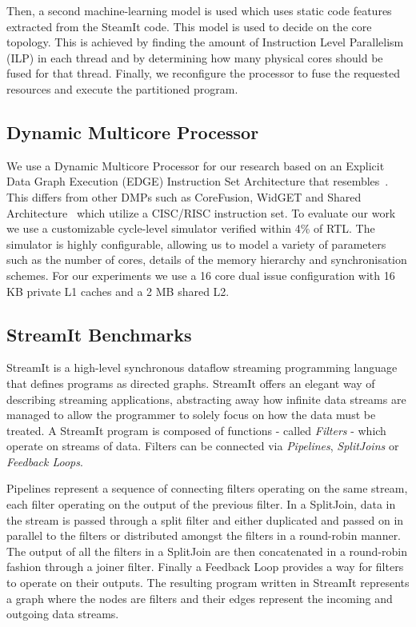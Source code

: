 Then, a second machine-learning model is used which uses static code features extracted from the SteamIt code.
This model is used to decide on the core topology.
This is achieved by finding the amount of Instruction Level Parallelism (ILP) in each thread and by determining how many physical cores should be fused for that thread.
Finally, we reconfigure the processor to fuse the requested resources and execute the partitioned program.


\subsection{Dynamic Multicore Processor}

We use a Dynamic Multicore Processor for our research based on an Explicit Data Graph Execution (EDGE) Instruction Set Architecture that resembles~\cite{sibi2014}.
This differs from other DMPs such as CoreFusion, WidGET and Shared Architecture~\cite{ipek2007corefusion,watanabe2010widget,zhou2014sharingarch} which utilize a CISC/RISC instruction set.
To evaluate our work we use a customizable cycle-level simulator verified within 4\% of RTL.
The simulator is highly configurable, allowing us to model a variety of parameters such as the number of cores, details of the memory hierarchy and synchronisation schemes.
For our experiments we use a 16 core dual issue configuration with 16 KB private L1 caches and a 2 MB shared L2.

\subsection{StreamIt Benchmarks}

StreamIt is a high-level synchronous dataflow streaming programming language that defines programs as directed graphs.
StreamIt offers an elegant way of describing streaming applications, abstracting away how infinite data streams are managed to allow the programmer to solely focus on how the data must be treated.
A StreamIt program is composed of functions - called \textit{Filters} - which operate on streams of data.
Filters can be connected via \textit{Pipelines}, \textit{SplitJoins} or \textit{Feedback Loops}.

Pipelines represent a sequence of connecting filters operating on the same stream, each filter operating on the output of the previous filter.
In a SplitJoin, data in the stream is passed through a split filter and either duplicated and passed on in parallel to the filters or distributed amongst the filters in a round-robin manner.
The output of all the filters in a SplitJoin are then concatenated in a round-robin fashion through a joiner filter.
Finally a Feedback Loop provides a way for filters to operate on their outputs.
The resulting program written in StreamIt represents a graph where the nodes are filters and their edges represent the incoming and outgoing data streams.

